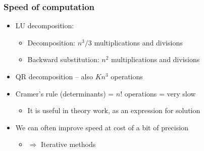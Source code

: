\documentclass[bigger]{beamer}
\begin{document}
\begin{frame}%

\frametitle{Speed of computation}

\begin{itemize}
\item LU decomposition:

\begin{itemize}
\item Decomposition: $n^{3}/3$ multiplications and divisions

\item Backward substitution: $n^{2}$ multiplications and divisions
\end{itemize}

\item QR decomposition -- also $Kn^{3}$ operations\bigskip

\item Cramer's rule (determinants) = $n!$ operations = very slow

\begin{itemize}
\item It is useful in theory work, as an expression for solution\bigskip
\end{itemize}

\item We can often improve speed \newline
at cost of a bit of precision

\begin{itemize}
\item $\Longrightarrow $ Iterative methods
\end{itemize}
\end{itemize}

\end{frame}%
\end{document}

